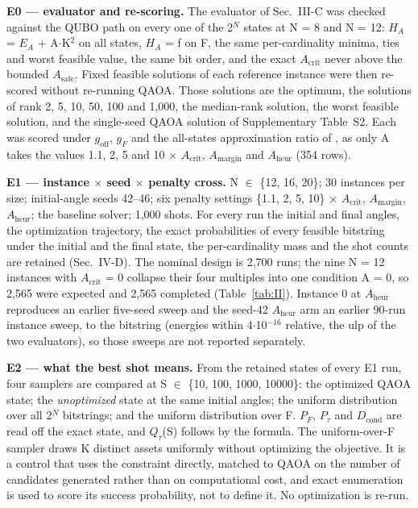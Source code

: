 \documentclass[journal]{IEEEtran}
\begin{document}
\textbf{E0 --- evaluator and re-scoring.} The evaluator of Sec.~III-C was checked against the QUBO path on every one of the 2$^{N}$ states at N = 8 and N = 12: $H_{A}$ = $E_{A}$ + A$\cdot$K$^{2}$ on all states, $H_{A}$ = f on F, the same per-cardinality minima, ties and worst feasible value, the same bit order, and the exact $A_{\mathrm{crit}}$ never above the bounded $A_{\mathrm{safe}}$. Fixed feasible solutions of each reference instance were then re-scored without re-running QAOA. Those solutions are the optimum, the solutions of rank 2, 5, 10, 50, 100 and 1,000, the median-rank solution, the worst feasible solution, and the single-seed QAOA solution of Supplementary Table~S2. Each was scored under $g_{\mathrm{off}}$, $g_{F}$ and the all-states approximation ratio of \cite{ref22}, as only A takes the values 1.1, 2, 5 and 10 $\times$ $A_{\mathrm{crit}}$, $A_{\mathrm{margin}}$ and $A_{\mathrm{heur}}$ (354 rows).


\textbf{E1 --- instance $\times$ seed $\times$ penalty cross.} N $\in$ \{12, 16, 20\}; 30 instances per size; initial-angle seeds 42--46; six penalty settings \{1.1, 2, 5, 10\} $\times$ $A_{\mathrm{crit}}$, $A_{\mathrm{margin}}$, $A_{\mathrm{heur}}$; the baseline solver; 1,000 shots. For every run the initial and final angles, the optimization trajectory, the exact probabilities of every feasible bitstring under the initial and the final state, the per-cardinality mass and the shot counts are retained (Sec.~IV-D). The nominal design is 2,700 runs; the nine N = 12 instances with $A_{\mathrm{crit}}$ = 0 collapse their four multiples into one condition A = 0, so 2,565 were expected and 2,565 completed (Table~\ref{tab:II}). Instance 0 at $A_{\mathrm{heur}}$ reproduces an earlier five-seed sweep and the seed-42 $A_{\mathrm{heur}}$ arm an earlier 90-run instance sweep, to the bitstring (energies within 4$\cdot$10$^{-16}$ relative, the ulp of the two evaluators), so those sweeps are not reported separately.


\textbf{E2 --- what the best shot means.} From the retained states of every E1 run, four samplers are compared at S $\in$ \{10, 100, 1000, 10000\}: the optimized QAOA state; the \textit{unoptimized} state at the same initial angles; the uniform distribution over all 2$^{N}$ bitstrings; and the uniform distribution over F. $P_{F}$, $P_{\tau}$ and $D_{\mathrm{cond}}$ are read off the exact state, and $Q_{\tau}$(S) follows by the formula. The uniform-over-F sampler draws K distinct assets uniformly without optimizing the objective. It is a control that uses the constraint directly, matched to QAOA on the number of candidates generated rather than on computational cost, and exact enumeration is used to score its success probability, not to define it. No optimization is re-run.
\end{document}

